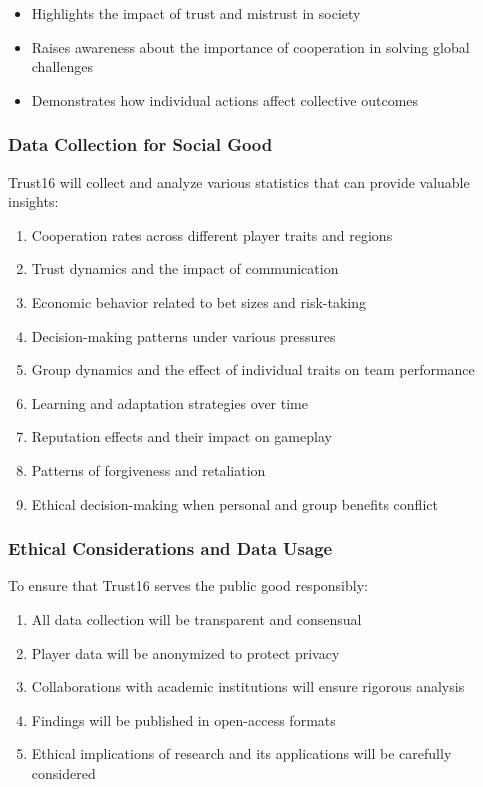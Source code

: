 \documentclass[]{article}
\begin{document}
\begin{itemize}
\tightlist
\item
  Highlights the impact of trust and mistrust in society
\item
  Raises awareness about the importance of cooperation in solving global
  challenges
\item
  Demonstrates how individual actions affect collective outcomes
\end{itemize}

\hypertarget{data-collection-for-social-good}{%
\subsubsection{Data Collection for Social
Good}\label{data-collection-for-social-good}}

Trust16 will collect and analyze various statistics that can provide
valuable insights:

\begin{enumerate}
\def\labelenumi{\arabic{enumi}.}
\tightlist
\item
  Cooperation rates across different player traits and regions
\item
  Trust dynamics and the impact of communication
\item
  Economic behavior related to bet sizes and risk-taking
\item
  Decision-making patterns under various pressures
\item
  Group dynamics and the effect of individual traits on team performance
\item
  Learning and adaptation strategies over time
\item
  Reputation effects and their impact on gameplay
\item
  Patterns of forgiveness and retaliation
\item
  Ethical decision-making when personal and group benefits conflict
\end{enumerate}

\hypertarget{ethical-considerations-and-data-usage}{%
\subsubsection{Ethical Considerations and Data
Usage}\label{ethical-considerations-and-data-usage}}

To ensure that Trust16 serves the public good responsibly:

\begin{enumerate}
\def\labelenumi{\arabic{enumi}.}
\tightlist
\item
  All data collection will be transparent and consensual
\item
  Player data will be anonymized to protect privacy
\item
  Collaborations with academic institutions will ensure rigorous
  analysis
\item
  Findings will be published in open-access formats
\item
  Ethical implications of research and its applications will be
  carefully considered
\end{enumerate}
\end{document}
